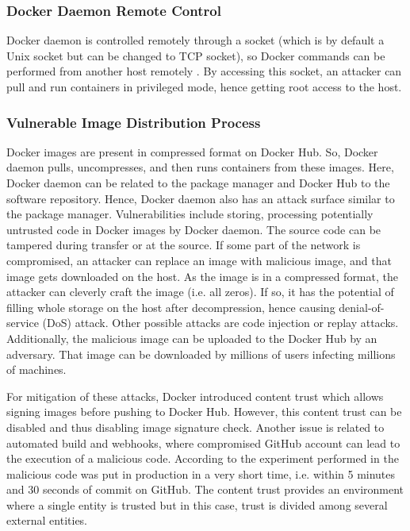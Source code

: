 \subsubsection{Docker Daemon Remote Control}

Docker daemon is controlled remotely through a socket (which
is by default a Unix socket but can be changed to TCP socket),
so Docker commands can be performed from another host
remotely \cite{combe2016docker}. By accessing this socket,
an attacker can pull and run containers in privileged mode,
hence getting root access to the host.

\subsubsection{Vulnerable Image Distribution Process}

Docker images are present in compressed format on Docker Hub.
So, Docker daemon pulls, uncompresses, and then runs containers
from these images. Here, Docker daemon can be related to the
package manager and Docker Hub to the software repository.
Hence, Docker daemon also has an attack surface similar
to the package manager. Vulnerabilities include storing,
processing potentially untrusted code in Docker images by
Docker daemon. The source code can be tampered during transfer
or at the source. If some part of the network is compromised,
an attacker can replace an image with malicious image, and
that image gets downloaded on the host. As the image is in
a compressed format, the attacker can cleverly craft the
image (i.e. all zeros). If so, it has the potential of
filling whole storage on the host after decompression,
hence causing
denial-of-service (DoS) attack. Other possible attacks are
code injection or replay attacks. Additionally, the malicious
image can be uploaded to the Docker Hub by an adversary.
That image can be downloaded by millions of users infecting
millions of machines.

For mitigation of these attacks, Docker introduced content
trust which allows signing images before pushing to Docker
Hub. However, this content trust can be disabled and thus disabling
image signature check. Another issue is related to automated build and
webhooks, where compromised GitHub
account can lead to the execution of a malicious code. According
to the experiment performed in \cite{martin2018docker} the
malicious code was put in production in a very short time, i.e. within 5 minutes and
30 seconds of commit on GitHub. The content trust provides
an environment where a single entity is trusted but in this
case, trust is divided among several external entities.


